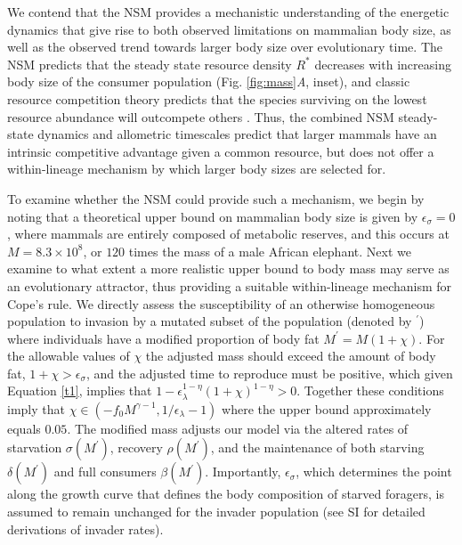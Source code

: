 \documentclass{pnastwo}
\begin{document}
\begin{article}



We contend that the NSM provides a mechanistic understanding of the energetic dynamics that give rise to both observed limitations on mammalian body size, as well as the observed trend towards larger body size over evolutionary time.
The NSM predicts that the steady state resource density $R^{*}$ decreases with increasing body size of the consumer population (Fig. \ref{fig:mass}\emph{A}, inset), and classic resource competition theory predicts that the species surviving on the lowest resource abundance will outcompete others \cite{tilman1981,dutkiewicz2009,barton2010}. Thus, the combined NSM steady-state dynamics and allometric timescales predict that larger mammals have an intrinsic competitive advantage given a common resource, but does not offer a within-lineage mechanism by which larger body sizes are selected for.

To examine whether the NSM could provide such a mechanism, we begin by noting that a theoretical upper bound on mammalian body size is given by $\epsilon_\sigma=0$, where mammals are entirely composed of metabolic reserves, and this occurs at $M=8.3\times 10^8$, or $120$ times the mass of a male African elephant.
Next we examine to what extent a more realistic upper bound to body mass may serve as an evolutionary attractor, thus providing a suitable within-lineage mechanism for Cope's rule.
We directly assess the susceptibility of an otherwise homogeneous population to invasion by a mutated subset of the population (denoted by $^\prime$) where individuals have a modified proportion of body fat $M^\prime=M(1+\chi)$.
For the allowable values of $\chi$ the adjusted mass should exceed the amount of body fat, $1+\chi>\epsilon_{\sigma}$, and the adjusted time to reproduce must be positive, which given Equation \ref{t1}, implies that $1-\epsilon_{\lambda}^{1-\eta}\left(1+\chi\right)^{1-\eta}>0$.
Together these conditions imply that  $\chi\in(-f_0M^{\gamma-1},1/\epsilon_{\lambda}-1)$ where the upper bound approximately equals $0.05$.
The modified mass adjusts our model via the altered rates of starvation $\sigma(M^\prime)$, recovery $\rho(M^\prime)$, and the maintenance of both starving $\delta(M^\prime)$ and full consumers $\beta(M^\prime)$.
Importantly, $\epsilon_\sigma$, which determines the point along the growth curve that defines the body composition of starved foragers, is assumed to remain unchanged for the invader population (see SI for detailed derivations of invader rates).


\end{article}
\end{document}
